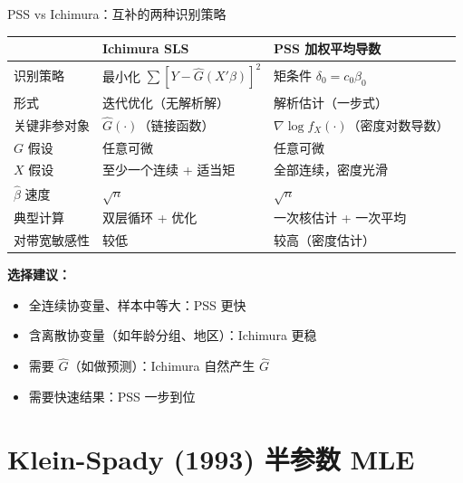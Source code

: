 \documentclass[aspectratio=169, 10pt]{beamer}
\begin{document}
\begin{frame}{PSS vs Ichimura：互补的两种识别策略}

  \begin{center}\footnotesize
  \begin{tabular}{p{2.8cm}|p{5.5cm}|p{5.5cm}}
  \hline
  & \textbf{Ichimura SLS} & \textbf{PSS 加权平均导数} \\
  \hline
  识别策略 & 最小化 $\sum [Y - \hat G(X'\beta)]^2$ & 矩条件 $\delta_0 = c_0 \beta_0$ \\
  \hline
  形式 & 迭代优化（无解析解） & 解析估计（一步式） \\
  \hline
  关键非参对象 & $\hat G(\cdot)$（链接函数）& $\nabla \log f_X(\cdot)$（密度对数导数）\\
  \hline
  $G$ 假设 & 任意可微 & 任意可微 \\
  \hline
  $X$ 假设 & 至少一个连续 + 适当矩 & 全部连续，密度光滑 \\
  \hline
  $\hat\beta$ 速度 & $\sqrt{n}$ & $\sqrt{n}$ \\
  \hline
  典型计算 & 双层循环 + 优化 & 一次核估计 + 一次平均 \\
  \hline
  对带宽敏感性 & 较低 & 较高（密度估计）\\
  \hline
  \end{tabular}
  \end{center}

  \begin{keybox}
    \textbf{选择建议：}
    \begin{itemize}\setlength{\itemsep}{1pt}
      \item 全连续协变量、样本中等大：PSS 更快
      \item 含离散协变量（如年龄分组、地区）：Ichimura 更稳
      \item 需要 $\hat G$（如做预测）：Ichimura 自然产生 $\hat G$
      \item 需要快速结果：PSS 一步到位
    \end{itemize}
  \end{keybox}

\end{frame}

\section{Klein-Spady (1993) 半参数 MLE}
\end{document}
